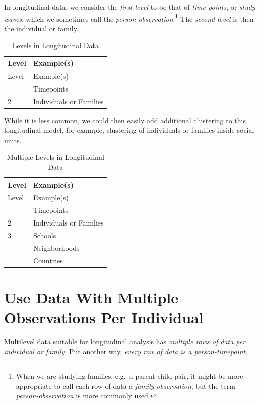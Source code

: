 \documentclass[
  letterpaper,
  DIV=11,
  numbers=noendperiod]{scrreprt}
\begin{document}
In longitudinal data, we consider the \emph{first level} to be that of
\emph{time points}, or \emph{study waves}, which we sometimes call the
\emph{person-observation}.\footnote{When we are studying families,
  e.g.~a parent-child pair, it might be more appropriate to call each
  row of data a \emph{family-observation}, but the term
  \emph{person-observation} is more commonly used.} The \emph{second
level} is then the individual or family. 

\begin{longtable}[]{@{}ll@{}}
\caption{Levels in Longitudinal
Data}\label{tbl-levelslongitudinal}\tabularnewline
\toprule\noalign{}
Level & Example(s) \\
\midrule\noalign{}
\endfirsthead
\toprule\noalign{}
Level & Example(s) \\
\midrule\noalign{}
\endhead
\bottomrule\noalign{}
\endlastfoot
1 & Timepoints \\
2 & Individuals or Families \\
\end{longtable}

While it is less common, we could then easily add additional clustering
to this longitudinal model, for example, clustering of individuals or
families inside social units.

\begin{longtable}[]{@{}ll@{}}
\caption{Multiple Levels in Longitudinal
Data}\label{tbl-levelslongitudinal2}\tabularnewline
\toprule\noalign{}
Level & Example(s) \\
\midrule\noalign{}
\endfirsthead
\toprule\noalign{}
Level & Example(s) \\
\midrule\noalign{}
\endhead
\bottomrule\noalign{}
\endlastfoot
1 & Timepoints \\
2 & Individuals or Families \\
3 & Schools \\
& Neighborhoods \\
& Countries \\
\end{longtable}

\section{Use Data With Multiple Observations Per
Individual}\label{use-data-with-multiple-observations-per-individual}

Multilevel data suitable for longitudinal analysis has \emph{multiple
rows of data per individual or family}. Put another way, \emph{every row
of data is a person-timepoint}.
\end{document}
